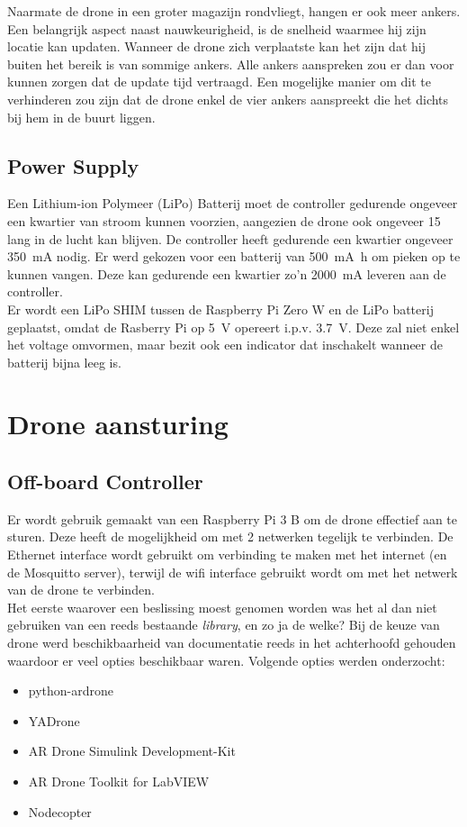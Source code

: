 Naarmate de drone in een groter magazijn rondvliegt, hangen er ook meer ankers.
Een belangrijk aspect naast nauwkeurigheid, is de snelheid waarmee hij zijn locatie kan updaten.
Wanneer de drone zich verplaatste kan het zijn dat hij buiten het bereik is van sommige ankers.
Alle ankers aanspreken zou er dan voor kunnen zorgen dat de update tijd vertraagd.
Een mogelijke manier om dit te verhinderen zou zijn dat de drone enkel de vier ankers aanspreekt die het dichts bij hem in de buurt liggen.

\subsection{Power Supply} \label{sec:power_supply}
Een Lithium-ion Polymeer (LiPo) Batterij moet de controller gedurende ongeveer een kwartier van stroom kunnen voorzien, aangezien de drone ook ongeveer \SI{15}{\min} lang in de lucht kan blijven.
De controller heeft gedurende een kwartier ongeveer \SI{350}{\mA} nodig.
Er werd gekozen voor een batterij van \SI{500}{\mA\hour} om pieken op te kunnen vangen.
Deze kan gedurende een kwartier zo'n \SI{2000}{\mA} leveren aan de controller.\\

Er wordt een LiPo SHIM tussen de Raspberry Pi Zero W en de LiPo batterij geplaatst, omdat de Rasberry Pi op \SI{5}{\V} opereert i.p.v. \SI{3.7}{\V}.
Deze zal niet enkel het voltage omvormen, maar bezit ook een indicator dat inschakelt wanneer de batterij bijna leeg is.

\section{Drone aansturing} \label{sec:drone_control}
\subsection{Off-board Controller} \label{sec:offboard_controller}
Er wordt gebruik gemaakt van een Raspberry Pi 3 B om de drone effectief aan te sturen.
Deze heeft de mogelijkheid om met 2 netwerken tegelijk te verbinden.
De Ethernet interface wordt gebruikt om verbinding te maken met het internet (en de Mosquitto server), terwijl de wifi interface gebruikt wordt om met het netwerk van de drone te verbinden.\\

Het eerste waarover een beslissing moest genomen worden was het al dan niet gebruiken van een reeds bestaande \textit{library}, en zo ja de welke?
Bij de keuze van drone werd beschikbaarheid van documentatie reeds in het achterhoofd gehouden waardoor er veel opties beschikbaar waren.
Volgende opties werden onderzocht:
\begin{itemize}
\item python-ardrone
\item YADrone
\item AR Drone Simulink Development-Kit
\item AR Drone Toolkit for LabVIEW
\item Nodecopter
\end{itemize}

